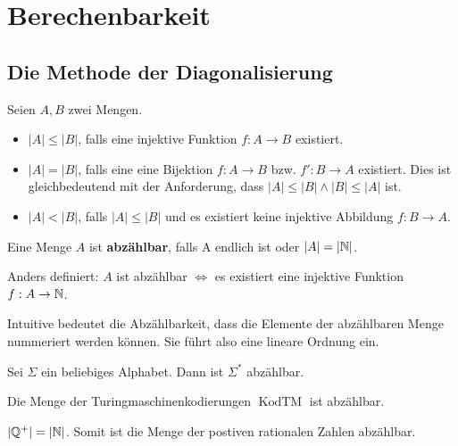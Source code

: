\chapter{Berechenbarkeit}
\section{Die Methode der Diagonalisierung}
\begin{definition}
Seien \(A, B\) zwei Mengen.
\begin{itemize}
  \item \(|A| \leq |B|\), falls eine injektive Funktion \(f: A \to B\) existiert.
  \item \(|A| = |B|\), falls eine eine Bijektion \(f: A \to B\) bzw. \(f': B \to A\) existiert. Dies ist gleichbedeutend mit der Anforderung, dass \(|A| \leq |B| \land |B| \leq |A|\) ist.
  \item \(|A| < |B|\), falls \(|A| \leq |B|\) und es existiert keine injektive Abbildung \(f: B \to A\).\\
\end{itemize}
\end{definition}

\begin{definition}
Eine Menge \(A\) ist \textbf{abzählbar}, falls A endlich ist oder \(|A| = |\mathbb{N}|\).

Anders definiert: \(A\) ist abzählbar \(\Leftrightarrow\) es existiert eine injektive Funktion \(f: A \to \mathbb{N}\).
\end{definition}

Intuitive bedeutet die Abzählbarkeit, dass die Elemente der abzählbaren Menge nummeriert werden können. Sie führt also eine lineare Ordnung ein.

\begin{lemma}
Sei \(\Sigma\) ein beliebiges Alphabet. Dann ist \(\Sigma^*\) abzählbar.\\
\end{lemma}

\begin{satz}
Die Menge der Turingmaschinenkodierungen \(\operatorname{KodTM}\) ist abzählbar.\\
\end{satz}

\begin{lemma}
\( |\mathbb{Q}^+| = |\mathbb{N}| \). Somit ist die Menge der postiven rationalen Zahlen abzählbar. \\
\end{lemma}

